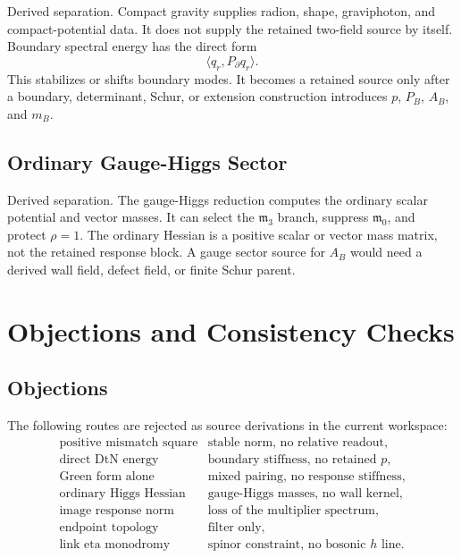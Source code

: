 \documentclass[11pt]{article}
\newcommand{\mzero}{\mathfrak m_0}
\newcommand{\mthree}{\mathfrak m_3}
\begin{document}
Derived separation.  Compact gravity supplies radion, shape, graviphoton,
and compact-potential data.  It does not supply the retained two-field
source by itself.  Boundary spectral energy has the direct form
\[
  \langle q_r,P_{\partial}q_r\rangle.
\]
This stabilizes or shifts boundary modes.  It becomes a retained source
only after a boundary, determinant, Schur, or extension construction
introduces \(p\), \(P_B\), \(A_B\), and \(m_B\).

\subsection{Ordinary Gauge-Higgs Sector}

Derived separation.  The gauge-Higgs reduction computes the ordinary scalar
potential and vector masses.  It can select the \(\mthree\) branch, suppress
\(\mzero\), and protect \(\rho=1\).  The ordinary Hessian is a positive
scalar or vector mass matrix, not the retained response block.  A gauge
sector source for \(A_B\) would need a derived wall field, defect field, or
finite Schur parent.

\section{Objections and Consistency Checks}

\subsection{Objections}

The following routes are rejected as source derivations in the current
workspace:
\[
\begin{array}{ll}
\text{positive mismatch square} & \text{stable norm, no relative readout},\\
\text{direct DtN energy} & \text{boundary stiffness, no retained }p,\\
\text{Green form alone} & \text{mixed pairing, no response stiffness},\\
\text{ordinary Higgs Hessian} & \text{gauge-Higgs masses, no wall kernel},\\
\text{image response norm} & \text{loss of the multiplier spectrum},\\
\text{endpoint topology} & \text{filter only},\\
\text{link eta monodromy} & \text{spinor constraint, no bosonic }h\text{ line}.
\end{array}
\]
\end{document}
